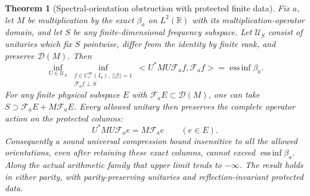 \documentclass[11pt]{article}
\def\norm#1{||#1||}%
\def\ip#1#2{<#1,#2>}%
\newtheorem{theorem}{Theorem}[section]
\theoremstyle{remark}
\newcommand{\norm}[1]{\left\lVert #1\right\rVert}
\newcommand{\ip}[2]{\left\langle #1,#2\right\rangle}
\begin{document}
\begin{theorem}[Spectral-orientation obstruction with protected finite data]
\label{thm:v139-protected-orbit}
Fix $a$, let $M$ be multiplication by the exact $\beta_a$ on
$L^2(\mathbb R)$ with its multiplication-operator domain, and let
$S$ be any finite-dimensional frequency subspace. Let $\mathcal U_S$
consist of unitaries which fix $S$ pointwise, differ from the identity
by finite rank, and preserve $\mathcal D(M)$. Then
\begin{equation}\label{eq:v139-orbit-edge}
 \inf_{U\in\mathcal U_S}
 \inf_{\substack{f\in C_c^\infty(I_a),\ \norm f=1\\
                 \mathcal F_af\perp S}}
 \ip{U^*MU\mathcal F_af}{\mathcal F_af}
       =\operatorname*{ess\,inf}\beta_a.
\end{equation}
For any finite physical subspace $E$ with
$\mathcal F_aE\subset\mathcal D(M)$, one can take
$S\supset\mathcal F_aE+M\mathcal F_aE$. Every allowed unitary then
preserves the complete operator action on the protected columns:
\begin{equation}\label{eq:v139-protected-columns}
 U^*MU\mathcal F_ae=M\mathcal F_ae\qquad(e\in E).
\end{equation}
Consequently a sound universal compression bound insensitive to all
the allowed orientations, even after retaining these exact columns,
cannot exceed $\operatorname*{ess\,inf}\beta_a$. Along the actual
arithmetic family that upper limit tends to $-\infty$.
The result holds in either parity, with parity-preserving unitaries
and reflection-invariant protected data.
\end{theorem}
\end{document}
